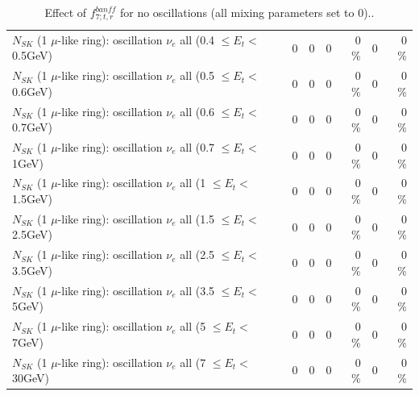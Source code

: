 \begin{table}
\begin{tabular}{| l | r | r | r  r | r  r |}
$N_{SK}$ (1 $\mu$-like ring): oscillation $\nu_{e}$ all (0.4 $\leq E_{t} <$ 0.5GeV) &               0 &               0 &               0 &        0 \%  &               0 &        0 \%  \\ 
$N_{SK}$ (1 $\mu$-like ring): oscillation $\nu_{e}$ all (0.5 $\leq E_{t} <$ 0.6GeV) &               0 &               0 &               0 &        0 \%  &               0 &        0 \%  \\ 
$N_{SK}$ (1 $\mu$-like ring): oscillation $\nu_{e}$ all (0.6 $\leq E_{t} <$ 0.7GeV) &               0 &               0 &               0 &        0 \%  &               0 &        0 \%  \\ 
$N_{SK}$ (1 $\mu$-like ring): oscillation $\nu_{e}$ all (0.7 $\leq E_{t} <$ 1GeV) &               0 &               0 &               0 &        0 \%  &               0 &        0 \%  \\ 
$N_{SK}$ (1 $\mu$-like ring): oscillation $\nu_{e}$ all (1 $\leq E_{t} <$ 1.5GeV) &               0 &               0 &               0 &        0 \%  &               0 &        0 \%  \\ 
$N_{SK}$ (1 $\mu$-like ring): oscillation $\nu_{e}$ all (1.5 $\leq E_{t} <$ 2.5GeV) &               0 &               0 &               0 &        0 \%  &               0 &        0 \%  \\ 
$N_{SK}$ (1 $\mu$-like ring): oscillation $\nu_{e}$ all (2.5 $\leq E_{t} <$ 3.5GeV) &               0 &               0 &               0 &        0 \%  &               0 &        0 \%  \\ 
$N_{SK}$ (1 $\mu$-like ring): oscillation $\nu_{e}$ all (3.5 $\leq E_{t} <$ 5GeV) &               0 &               0 &               0 &        0 \%  &               0 &        0 \%  \\ 
 $N_{SK}$ (1 $\mu$-like ring): oscillation $\nu_{e}$ all (5 $\leq E_{t} <$ 7GeV) &               0 &               0 &               0 &        0 \%  &               0 &        0 \%  \\ 
$N_{SK}$ (1 $\mu$-like ring): oscillation $\nu_{e}$ all (7 $\leq E_{t} <$ 30GeV) &               0 &               0 &               0 &        0 \%  &               0 &        0 \%  \\ 
\hline
\hline
\end{tabular}
\caption{ Effect of $f_{7; t, r}^{banff}$ for no oscillations (all mixing parameters set to 0).. }
\label{tab:num_banff_07_1RmuT_3f_osc_t13:0}
\end{table}
\clearpage
